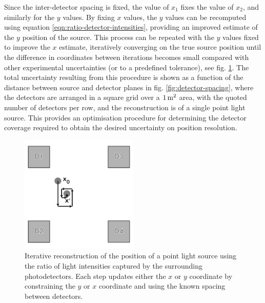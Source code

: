 Since the inter-detector spacing is fixed, the value of $x_1$ fixes the value of $x_2$, and similarly for the $y$ values. By fixing $x$ values, the $y$ values can be recomputed using equation \eqref{eqn:ratio-detector-intensities}, providing an improved estimate of the $y$ position of the source. This process can be repeated with the $y$ values fixed to improve the $x$ estimate, iteratively converging on the true source position until the difference in coordinates between iterations becomes small compared with other experimental uncertainties (or to a predefined tolerance), see fig. \ref{fig:iterative-source-recon}. The total uncertainty resulting from this procedure is shown as a function of the distance between source and detector planes in fig. \ref{fig:detector-spacing}, where the detectors are arranged in a square grid over a $1\metre^2$ area, with the quoted number of detectors per row, and the reconstruction is of a single point light source. This provides an optimisation procedure for determining the detector coverage required to obtain the desired uncertainty on position resolution.

\begin{figure}
\centering
\includegraphics[width=0.5\textwidth]{chapters/detectorphysics_images/Iterative-Source-Recon}
\caption[Iterative point light source position reconstruction]{\label{fig:iterative-source-recon}Iterative reconstruction of the position of a point light source using the ratio of light intensities captured by the surrounding photodetectors. Each step updates either the $x$ or $y$ coordinate by constraining the $y$ or $x$ coordinate and using the known spacing between detectors.}
\end{figure}

